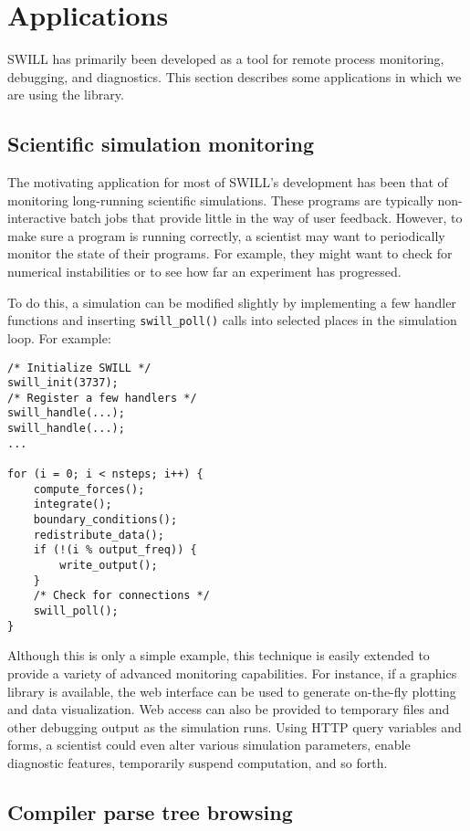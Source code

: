 \section{Applications}

SWILL has primarily been developed as a tool for remote process monitoring,
debugging, and diagnostics.   This section describes some applications in
which we are using the library.

\subsection{Scientific simulation monitoring}

The motivating application for most of SWILL's development has been
that of monitoring long-running scientific simulations.  These
programs are typically non-interactive batch jobs that provide little
in the way of user feedback.  However, to make sure a program is running
correctly, a scientist may want to periodically monitor the state of
their programs.  For example, they might want to check for numerical
instabilities or to see how far an experiment has progressed.

To do this, a simulation can be modified slightly by implementing a few handler
functions and inserting {\tt swill\_poll()} calls into selected places
in the simulation loop.  For example:

\begin{verbatim}
/* Initialize SWILL */
swill_init(3737);
/* Register a few handlers */
swill_handle(...);
swill_handle(...);
...

for (i = 0; i < nsteps; i++) {
    compute_forces();
    integrate();
    boundary_conditions();
    redistribute_data();
    if (!(i % output_freq)) {
        write_output();
    }
    /* Check for connections */
    swill_poll();
}
\end{verbatim}

Although this is only a simple example, this technique is easily extended
to provide a variety of advanced monitoring capabilities.  For
instance, if a graphics library is available, the web interface can be
used to generate on-the-fly plotting and data visualization.  Web access
can also be provided to temporary files and other debugging output as
the simulation runs.  Using HTTP query variables and forms, a
scientist could even alter various simulation parameters, enable
diagnostic features, temporarily suspend computation, and so forth.

\subsection{Compiler parse tree browsing}


